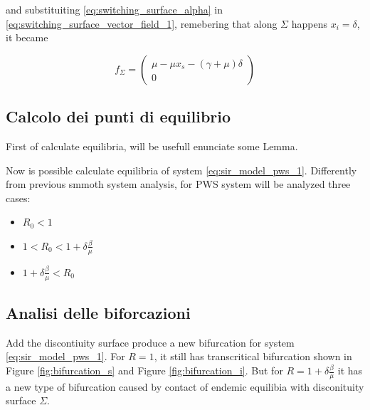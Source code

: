 and substituiting \ref{eq:switching_surface_alpha} in \ref{eq:switching_surface_vector_field_1}, remebering that along $\Sigma$ happens $x_i = \delta$,  it became

\begin{equation}
    \label{eq:switching_surface_vector_field_2}
    f_\Sigma = \begin{pmatrix} \mu - \mu x_s - (\gamma +\mu) \delta \\ 0 \end{pmatrix}
\end{equation}

\subsection{Calcolo dei punti di equilibrio}

First of calculate equilibria, will be usefull enunciate some Lemma.





Now is possible calculate equilibria of system \ref{eq:sir_model_pws_1}. Differently from previous smmoth system analysis, for PWS system will be analyzed three cases:
\begin{itemize}
    \item $R_0 < 1$
    \item $1 < R_0 < 1+\delta\frac{\beta}{\mu}$
    \item $1+\delta\frac{\beta}{\mu} < R_0$
\end{itemize}







\subsection{Analisi delle biforcazioni}
Add the discontiuity surface produce a new bifurcation for system \ref{eq:sir_model_pws_1}.
For $R = 1$, it still has transcritical bifurcation shown in Figure \ref{fig:bifurcation_s} and Figure \ref{fig:bifurcation_i}.
But for $ R = 1+\delta\frac{\beta}{\mu}$ it has a new type of bifurcation caused by contact of endemic equilibia with disconituity surface $\Sigma$.



